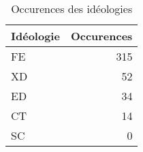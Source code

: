 \begin{table}

\caption{Occurences des idéologies}
\centering
\begin{tabular}[t]{l|r}
\hline
Idéologie & Occurences\\
\hline
FE & 315\\
\hline
XD & 52\\
\hline
ED & 34\\
\hline
CT & 14\\
\hline
SC & 0\\
\hline
\end{tabular}
\end{table}
